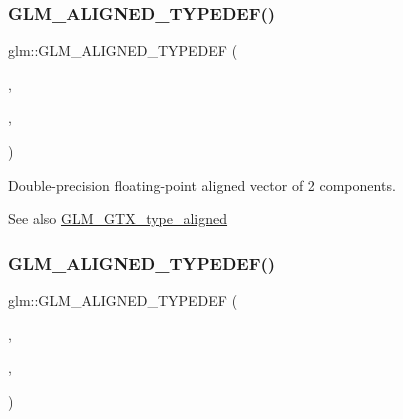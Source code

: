 \subsubsection{\texorpdfstring{G\+L\+M\+\_\+\+A\+L\+I\+G\+N\+E\+D\+\_\+\+T\+Y\+P\+E\+D\+E\+F()}{GLM\_ALIGNED\_TYPEDEF()}\hspace{0.1cm}{\footnotesize\ttfamily [160/209]}}
{\footnotesize\ttfamily glm\+::\+G\+L\+M\+\_\+\+A\+L\+I\+G\+N\+E\+D\+\_\+\+T\+Y\+P\+E\+D\+EF (\begin{DoxyParamCaption}\item[{\hyperlink{group__gtc__type__precision_gacde4fe7b129521888cd30672c34650c5}{f64vec2}}]{,  }\item[{aligned\+\_\+f64vec2}]{,  }\item[{16}]{ }\end{DoxyParamCaption})}

Double-\/precision floating-\/point aligned vector of 2 components. \begin{DoxySeeAlso}{See also}
\hyperlink{group__gtx__type__aligned}{G\+L\+M\+\_\+\+G\+T\+X\+\_\+type\+\_\+aligned} 
\end{DoxySeeAlso}
\mbox{\label{group__gtx__type__aligned_gaf3d3bbc1e93909b689123b085e177a14}} 
\subsubsection{\texorpdfstring{G\+L\+M\+\_\+\+A\+L\+I\+G\+N\+E\+D\+\_\+\+T\+Y\+P\+E\+D\+E\+F()}{GLM\_ALIGNED\_TYPEDEF()}\hspace{0.1cm}{\footnotesize\ttfamily [161/209]}}
{\footnotesize\ttfamily glm\+::\+G\+L\+M\+\_\+\+A\+L\+I\+G\+N\+E\+D\+\_\+\+T\+Y\+P\+E\+D\+EF (\begin{DoxyParamCaption}\item[{\hyperlink{group__gtc__type__precision_gac531875c6544b7919f36a86cbe538736}{f64vec3}}]{,  }\item[{aligned\+\_\+f64vec3}]{,  }\item[{32}]{ }\end{DoxyParamCaption})}

